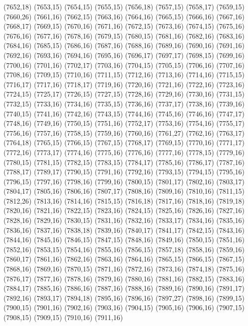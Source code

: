(7652,18)
(7653,15)
(7654,15)
(7655,15)
(7656,18)
(7657,15)
(7658,17)
(7659,15)
(7660,26)
(7661,16)
(7662,15)
(7663,16)
(7664,16)
(7665,15)
(7666,16)
(7667,16)
(7668,17)
(7669,15)
(7670,16)
(7671,16)
(7672,15)
(7673,16)
(7674,15)
(7675,16)
(7676,16)
(7677,16)
(7678,16)
(7679,15)
(7680,15)
(7681,16)
(7682,16)
(7683,16)
(7684,16)
(7685,15)
(7686,16)
(7687,16)
(7688,16)
(7689,16)
(7690,16)
(7691,16)
(7692,16)
(7693,16)
(7694,16)
(7695,16)
(7696,17)
(7697,17)
(7698,15)
(7699,16)
(7700,16)
(7701,16)
(7702,17)
(7703,16)
(7704,15)
(7705,15)
(7706,16)
(7707,16)
(7708,16)
(7709,15)
(7710,16)
(7711,15)
(7712,16)
(7713,16)
(7714,16)
(7715,15)
(7716,17)
(7717,16)
(7718,17)
(7719,16)
(7720,16)
(7721,16)
(7722,16)
(7723,16)
(7724,15)
(7725,17)
(7726,15)
(7727,15)
(7728,16)
(7729,16)
(7730,16)
(7731,15)
(7732,15)
(7733,16)
(7734,16)
(7735,15)
(7736,16)
(7737,17)
(7738,16)
(7739,16)
(7740,15)
(7741,16)
(7742,16)
(7743,15)
(7744,16)
(7745,16)
(7746,16)
(7747,17)
(7748,16)
(7749,16)
(7750,15)
(7751,16)
(7752,17)
(7753,16)
(7754,16)
(7755,17)
(7756,16)
(7757,16)
(7758,15)
(7759,16)
(7760,16)
(7761,27)
(7762,16)
(7763,17)
(7764,18)
(7765,15)
(7766,15)
(7767,15)
(7768,17)
(7769,15)
(7770,16)
(7771,17)
(7772,16)
(7773,17)
(7774,16)
(7775,16)
(7776,16)
(7777,16)
(7778,15)
(7779,16)
(7780,15)
(7781,15)
(7782,15)
(7783,15)
(7784,17)
(7785,16)
(7786,17)
(7787,16)
(7788,17)
(7789,17)
(7790,15)
(7791,16)
(7792,16)
(7793,15)
(7794,15)
(7795,16)
(7796,15)
(7797,16)
(7798,16)
(7799,16)
(7800,15)
(7801,17)
(7802,16)
(7803,17)
(7804,17)
(7805,16)
(7806,16)
(7807,17)
(7808,16)
(7809,16)
(7810,16)
(7811,15)
(7812,26)
(7813,16)
(7814,16)
(7815,15)
(7816,18)
(7817,16)
(7818,16)
(7819,18)
(7820,16)
(7821,16)
(7822,15)
(7823,16)
(7824,15)
(7825,16)
(7826,16)
(7827,16)
(7828,16)
(7829,16)
(7830,15)
(7831,16)
(7832,16)
(7833,17)
(7834,16)
(7835,16)
(7836,16)
(7837,16)
(7838,18)
(7839,16)
(7840,17)
(7841,17)
(7842,15)
(7843,16)
(7844,16)
(7845,16)
(7846,15)
(7847,15)
(7848,16)
(7849,16)
(7850,15)
(7851,16)
(7852,16)
(7853,15)
(7854,16)
(7855,16)
(7856,15)
(7857,18)
(7858,16)
(7859,16)
(7860,17)
(7861,16)
(7862,16)
(7863,16)
(7864,16)
(7865,15)
(7866,15)
(7867,15)
(7868,16)
(7869,16)
(7870,15)
(7871,16)
(7872,16)
(7873,16)
(7874,18)
(7875,16)
(7876,17)
(7877,16)
(7878,16)
(7879,16)
(7880,16)
(7881,16)
(7882,15)
(7883,16)
(7884,17)
(7885,16)
(7886,16)
(7887,16)
(7888,16)
(7889,16)
(7890,16)
(7891,17)
(7892,16)
(7893,17)
(7894,18)
(7895,16)
(7896,16)
(7897,27)
(7898,16)
(7899,15)
(7900,15)
(7901,16)
(7902,16)
(7903,16)
(7904,15)
(7905,16)
(7906,16)
(7907,15)
(7908,15)
(7909,15)
(7910,16)
(7911,16)
